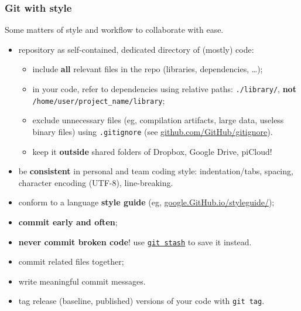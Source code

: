 \documentclass[10pt,svgnames,handout]{beamer}
\begin{document}
\begin{frame}
\label{style}
\frametitle{Git with style}

Some matters of style and workflow to collaborate with ease.

\begin{itemize}[<+->]
\item repository as self-contained, dedicated directory of (mostly) code:
\begin{itemize}
  \item include \textbf{all} relevant files in the repo (libraries, dependencies, \ldots);
  \item in your code, refer to dependencies using relative paths: \lstinline{./library/}, \textbf{not} \lstinline{/home/user/project_name/library};
  \item exclude unnecessary files (eg, compilation artifacts, large data, useless binary files) using \texttt{.gitignore} (see \href{https://github.com/GitHub/gitignore}{github.com/GitHub/gitignore}).
  \item keep it \textbf{outside} shared folders of Dropbox, Google Drive, piCloud!
\end{itemize}
\item be \textbf{consistent} in personal and team coding style: indentation/tabs, spacing, character encoding (UTF-8), line-breaking.
\item conform to a language \textbf{style guide} (eg, \href{https://google.GitHub.io/styleguide/}{google.GitHub.io/styleguide/});
\item \textbf{commit early and often};
\item \textbf{never commit broken code}! use \href{https://git-scm.com/book/it/v2/Git-Tools-Stashing-and-Cleaning}{\lstinline{git stash}} to save it instead.
\item commit related files together;
\item write meaningful commit messages.
\item tag release (baseline, published) versions of your code with \lstinline{git tag}.
\end{itemize}

\end{frame}



\end{document}
